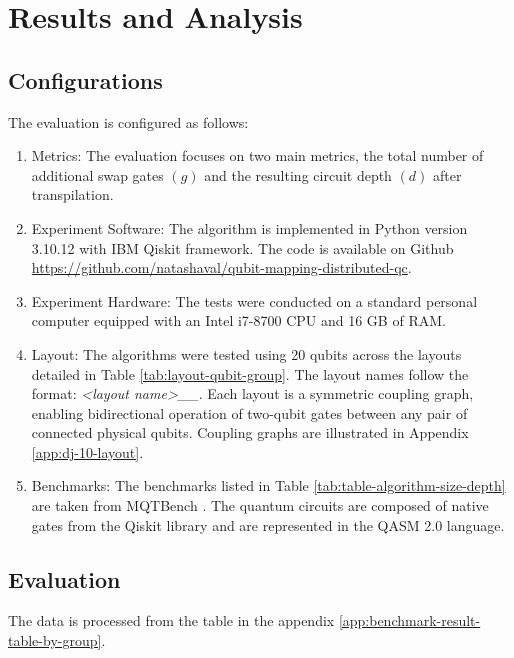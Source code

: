 \chapter{Results and Analysis} \label{Chap4}
\section{Configurations} %
The evaluation is configured as follows:
\begin{enumerate}[nolistsep]
    \item Metrics: The evaluation focuses on two main metrics, the total number of additional swap gates $(g)$ and the resulting circuit depth $(d)$ after transpilation.
    \item Experiment Software: The algorithm is implemented in Python version 3.10.12 with IBM Qiskit framework. The code is available on Github \url{https://github.com/natashaval/qubit-mapping-distributed-qc}.
    \item Experiment Hardware: The tests were conducted on a standard personal computer equipped with an Intel i7-8700 CPU and 16 GB of RAM.
    \item Layout: The algorithms were tested using 20 qubits across the layouts detailed in Table  \ref{tab:layout-qubit-group}. The layout names follow the format: \textit{<layout name>\_<number of qubits>\_<number of groups>}. Each layout is a symmetric coupling graph, enabling bidirectional operation of two-qubit gates between any pair of connected physical qubits. Coupling graphs are illustrated in Appendix \ref{app:dj-10-layout}.
        
    \item Benchmarks: The benchmarks  listed in Table \ref{tab:table-algorithm-size-depth} are taken from MQTBench \cite{quetschlich_mqt_2023}. The quantum circuits are composed of native gates from the Qiskit library and are represented in the QASM 2.0 language.
        
\end{enumerate}

\section{Evaluation}
The data is processed from the table in the appendix \ref{app:benchmark-result-table-by-group}.
